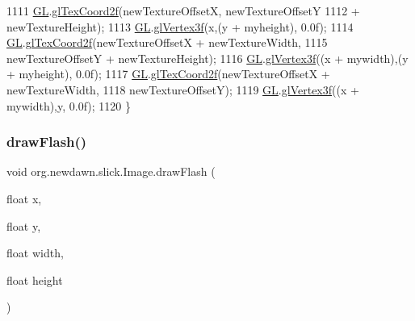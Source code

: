 \begin{DoxyCode}
1111         \mbox{\hyperlink{classorg_1_1newdawn_1_1slick_1_1_image_aafbab31355bec79e747f477e970dcda4}{GL}}.\mbox{\hyperlink{interfaceorg_1_1newdawn_1_1slick_1_1opengl_1_1renderer_1_1_s_g_l_a5f661318cf9926c586a9837d0ded9fbd}{glTexCoord2f}}(newTextureOffsetX, newTextureOffsetY
1112                 + newTextureHeight);
1113         \mbox{\hyperlink{classorg_1_1newdawn_1_1slick_1_1_image_aafbab31355bec79e747f477e970dcda4}{GL}}.\mbox{\hyperlink{interfaceorg_1_1newdawn_1_1slick_1_1opengl_1_1renderer_1_1_s_g_l_ae2baba1598d723f9059f45e0871be822}{glVertex3f}}(x,(y + myheight), 0.0f);
1114         \mbox{\hyperlink{classorg_1_1newdawn_1_1slick_1_1_image_aafbab31355bec79e747f477e970dcda4}{GL}}.\mbox{\hyperlink{interfaceorg_1_1newdawn_1_1slick_1_1opengl_1_1renderer_1_1_s_g_l_a5f661318cf9926c586a9837d0ded9fbd}{glTexCoord2f}}(newTextureOffsetX + newTextureWidth,
1115                 newTextureOffsetY + newTextureHeight);
1116         \mbox{\hyperlink{classorg_1_1newdawn_1_1slick_1_1_image_aafbab31355bec79e747f477e970dcda4}{GL}}.\mbox{\hyperlink{interfaceorg_1_1newdawn_1_1slick_1_1opengl_1_1renderer_1_1_s_g_l_ae2baba1598d723f9059f45e0871be822}{glVertex3f}}((x + mywidth),(y + myheight), 0.0f);
1117         \mbox{\hyperlink{classorg_1_1newdawn_1_1slick_1_1_image_aafbab31355bec79e747f477e970dcda4}{GL}}.\mbox{\hyperlink{interfaceorg_1_1newdawn_1_1slick_1_1opengl_1_1renderer_1_1_s_g_l_a5f661318cf9926c586a9837d0ded9fbd}{glTexCoord2f}}(newTextureOffsetX + newTextureWidth,
1118                 newTextureOffsetY);
1119         \mbox{\hyperlink{classorg_1_1newdawn_1_1slick_1_1_image_aafbab31355bec79e747f477e970dcda4}{GL}}.\mbox{\hyperlink{interfaceorg_1_1newdawn_1_1slick_1_1opengl_1_1renderer_1_1_s_g_l_ae2baba1598d723f9059f45e0871be822}{glVertex3f}}((x + mywidth),y, 0.0f);
1120     \}
\end{DoxyCode}
\mbox{\label{classorg_1_1newdawn_1_1slick_1_1_image_a5413e23c618b2219effab1115eab40eb}} 
\subsubsection{\texorpdfstring{draw\+Flash()}{drawFlash()}\hspace{0.1cm}{\footnotesize\ttfamily [1/3]}}
{\footnotesize\ttfamily void org.\+newdawn.\+slick.\+Image.\+draw\+Flash (\begin{DoxyParamCaption}\item[{float}]{x,  }\item[{float}]{y,  }\item[{float}]{width,  }\item[{float}]{height }\end{DoxyParamCaption})\hspace{0.3cm}{\ttfamily [inline]}}

